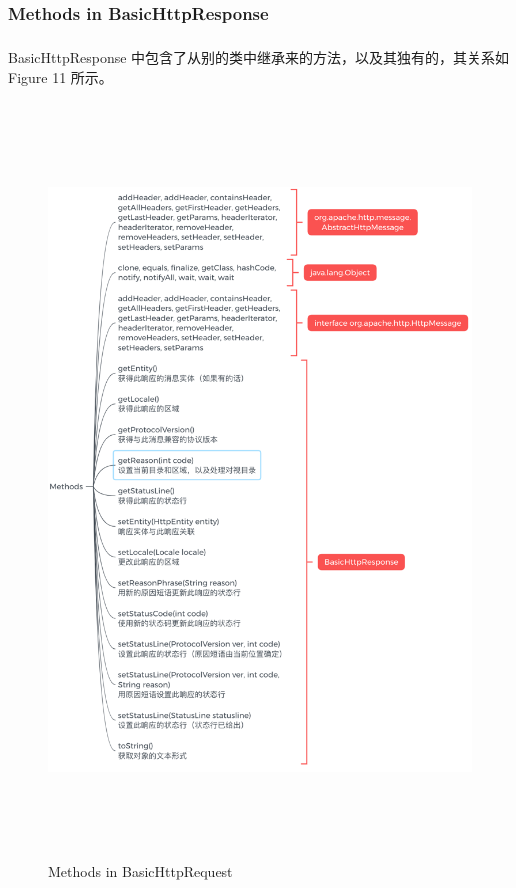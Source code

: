 \documentclass{article}
\begin{document}
	\subsubsection{Methods in BasicHttpResponse}
	\begin{CJK}{UTF8}{gbsn}
		\subparagraph{}
		BasicHttpResponse 中包含了从别的类中继承来的方法，以及其独有的，其关系如 Figure 11 所示。
	\end{CJK}{}
	\begin{figure}[H]
		\centering
		\includegraphics[height = 20cm, width = 16cm]{pics/21_BasicHttpResponse.png}	
		\caption{Methods in BasicHttpRequest}
	\end{figure}
\end{document}
